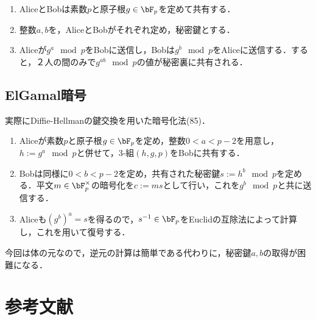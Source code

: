\documentclass[uplatex,dvipdfmx]{jsreport}
\begin{document}
\begin{definition}\mbox{}
    \begin{enumerate}
        \item AliceとBobは素数$p$と原子根$g\in\bF_p$を定めて共有する．
        \item 整数$a,b$を，AliceとBobがそれぞれ定め，秘密鍵とする．
        \item Aliceが$g^a\mod p$をBobに送信し，Bobは$g^b\mod p$をAliceに送信する．すると，２人の間のみで$g^{ab}\mod p$の値が秘密裏に共有される．
    \end{enumerate}
\end{definition}

\section{ElGamal暗号}

\begin{tcolorbox}[colframe=ForestGreen, colback=ForestGreen!10!white,breakable,colbacktitle=ForestGreen!40!white,coltitle=black,fonttitle=\bfseries\sffamily,
title=]
    実際にDiffie-Hellmanの鍵交換を用いた暗号化法(85)．
\end{tcolorbox}

\begin{definition}\mbox{}
    \begin{enumerate}
        \item Aliceが素数$p$と原子根$g\in\bF_p$を定め，整数$0<a<p-2$を用意し，$h:=g^a\mod p$と併せて，3-組$(h,g,p)$をBobに共有する．
        \item Bobは同様に$0<b<p-2$を定め，共有された秘密鍵$s:=h^b\mod p$を定める．平文$m\in\bF^\times_p$の暗号化を$c:=ms$として行い，これを$g^b\mod p$と共に送信する．
        \item Aliceも$(g^b)^a=s$を得るので，$s^{-1}\in\bF_p$をEuclidの互除法によって計算し，これを用いて復号する．
    \end{enumerate}
\end{definition}
\begin{remarks}
    今回は体の元なので，逆元の計算は簡単である代わりに，秘密鍵$a,b$の取得が困難になる．
\end{remarks}

\chapter{参考文献}


\end{document}
